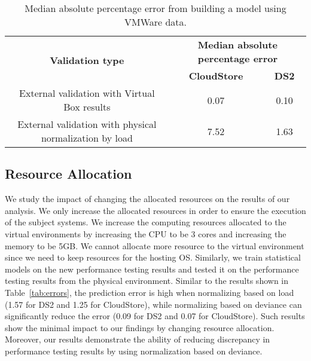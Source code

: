 \begin{table}[tbh]
	\centering
	\caption{Median absolute percentage error from building a model using VMWare data.}
	\label{tab:vmware}
		\begin{tabular}{|c||c|c|}
			\hline
			\multirow{2}{*}{\textbf{Validation type}} & \multicolumn{2}{c|}{\textbf{Median absolute percentage error}} \\ \cline{2-3} 
			& \textbf{CloudStore} & \textbf{DS2} \\ %
			\midrule
			\midrule
			External validation with Virtual Box results& 0.07&0.10\\ \hline
			External validation with physical normalization by load & 7.52& 1.63 \\ \hline
		\end{tabular}
\end{table}

\subsection{Resource Allocation}

We study the impact of changing the allocated resources on the results of our analysis. We only increase the allocated resources in order to ensure the execution of the subject systems. We increase the computing resources allocated to the virtual environments by increasing the CPU to be 3 cores and increasing the memory to be 5GB. We cannot allocate more resource to the virtual environment since we need to keep resources for the hosting OS. Similarly, we train statistical models on the new performance testing results and tested it on the performance testing results from the physical environment. Similar to the results shown in Table~\ref{tab:errors}, the prediction error is high when normalizing based on load (1.57 for DS2 and 1.25 for CloudStore), while normalizing based on deviance can significantly reduce the error (0.09 for DS2 and 0.07 for CloudStore). Such results show the minimal impact to our findings by changing resource allocation. Moreover, our results demonstrate the ability of reducing discrepancy in performance testing results by using normalization based on deviance. 
